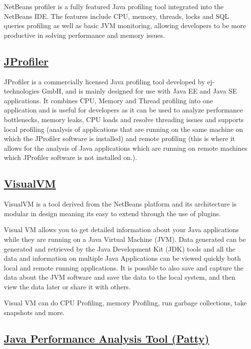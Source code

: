 NetBeans profiler is a fully featured Java profiling tool integrated into the NetBeans IDE. The features include CPU, memory, threads, locks and SQL queries profiling as well as basic JVM monitoring, allowing developers to be more productive in solving performance and memory issues.


\subsection{\href{https://www.ej-technologies.com/products/jprofiler/overview.html}{JProfiler}}

JProfiler is a commercially licensed Java profiling tool developed by ej-technologies GmbH, and is mainly designed for use with Java EE and Java SE applications.
It combines CPU, Memory and Thread profiling into one application and is useful for developers as it can be used to analyze performance bottlenecks, memory leaks, CPU loads  and resolve threading issues and supports local profiling (analysis of applications that are running on the same machine on which the JProfiler software is installed) and remote profiling (this is where it allows for the analysis of Java applications which are running on remote machines which JProfiler software is not installed on.).


\subsection{\href{http://visualvm.github.io/}{VisualVM}}


VisualVM is a tool derived from the NetBeans platform and its architecture is modular in design meaning its easy to extend through the use of plugins.

Visual VM allows you to get detailed information about your Java applications while they are running on a Java Virtual Machine (JVM). Data generated can be generated and retrieved by the Java Development Kit (JDK) tools and all the data and information on multiple Java Applications can be viewed quickly both local and remote running applications.  It is possible to also save and capture the data about the JVM software and save the data to the local system, and then view the data later or share it with others.

Visual VM can do CPU Profiling, memory Profiling, run garbage collections, take snapshots and more.


\subsection{\href{http://patty.sourceforge.net/}{Java Performance Analysis Tool (Patty)}}

